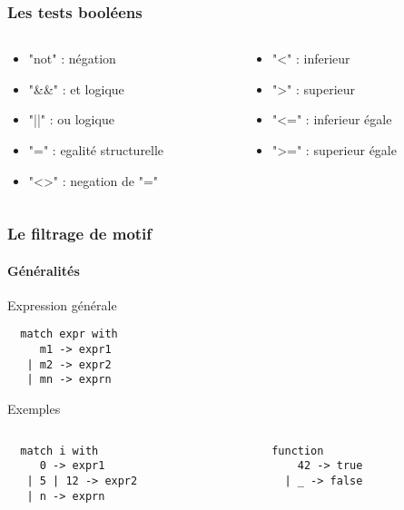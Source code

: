 \begin{frame}[fragile]
    \frametitle{Les tests booléens}
	\begin{columns}
		\begin{column}{5cm}
			\begin{itemize}
				\item "not" : négation
				\item "\&\&" : et logique
				\item "||" : ou logique
				\item "=" : egalité structurelle
				\item "<>" : negation de "="
			\end{itemize}
		\end{column}
		\begin{column}{5cm}
			\begin{itemize}
				\item "<" : inferieur 
				\item ">" : superieur
				\item "<=" : inferieur égale
				\item ">=" : superieur égale
			\end{itemize}
		\end{column}
	\end{columns}
\end{frame}

\begin{frame}[fragile]
	\frametitle{Le filtrage de motif}
	\framesubtitle{Généralités}
	\begin{block}{Expression générale}
		\begin{lstlisting}
  match expr with
     m1 -> expr1
   | m2 -> expr2
   | mn -> exprn
		\end{lstlisting}
	\end{block}
	\begin{block}{Exemples}
		\begin{columns}
		\begin{column}{5cm}
		\begin{lstlisting}
  match i with
     0 -> expr1
   | 5 | 12 -> expr2
   | n -> exprn
		\end{lstlisting}
		\end{column}
		\begin{column}{5cm}
		\begin{lstlisting}
  function
      42 -> true
    | _ -> false
		\end{lstlisting} 
		\end{column}
	\end{columns}
	\end{block}
\end{frame}

